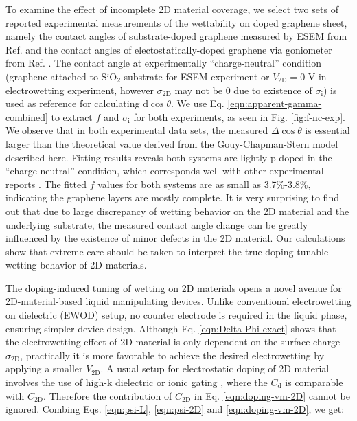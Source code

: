 \documentclass[aps,prl,reprint,groupedaddress,amsmath,amssymb, showpacs]{revtex4-1}
\begin{document}
To examine the effect of incomplete 2D material coverage, we select
two sets of reported experimental measurements of the wettability on
doped graphene sheet, namely the contact angles of substrate-doped
graphene measured by ESEM from Ref. \cite{ashraf_doping-induced_2016}
and the contact angles of electostatically-doped graphene via
goniometer from Ref. \cite{hong_mechanism_2016}. The contact angle at
experimentally ``charge-neutral'' condition (graphene attached to SiO\(_{\text{2}}\)
substrate for ESEM experiment or \(V_{\mathrm{2D}}=0\) V in
electrowetting experiment, however \(\sigma_{\mathrm{2D}}\) may not be 0
due to existence of \(\sigma_{\mathrm{i}}\)) is used as reference for
calculating \(\mathrm{d}\cos\theta\). We use
Eq. \ref{eqn:apparent-gamma-combined} to extract \(f\) and
\(\sigma_{\mathrm{i}}\) for both experiments, as seen in
Fig. \ref{fig:f-nc-exp}. We observe that in both experimental data sets,
the measured \(\Delta \cos \theta\) is essential larger than the
theoretical value derived from the Gouy-Chapman-Stern model described
here. Fitting results reveals both systems are lightly p-doped in the
``charge-neutral'' condition, which corresponds well with other
experimental reports
\cite{Shih2015PartiallyScreened,goniszewski_correlation_2016}.  The
fitted \(f\) values for both systems are as small as 3.7\%-3.8\%,
indicating the graphene layers are mostly complete. It is very
surprising to find out that due to large discrepancy of wetting
behavior on the 2D material and the underlying substrate, the measured
contact angle change can be greatly influenced by the existence of
minor defects in the 2D material. Our calculations show that extreme
care should be taken to interpret the true doping-tunable wetting
behavior of 2D materials.


The doping-induced tuning of wetting on 2D materials opens a novel
avenue for 2D-material-based liquid manipulating devices. Unlike
conventional electrowetting on dielectric (EWOD) setup, no counter
electrode is required in the liquid phase, ensuring simpler device
design. Although Eq. \ref{eqn:Delta-Phi-exact} shows that the
electrowetting effect of 2D material is only dependent on the surface
charge \(\sigma_{\mathrm{2D}}\), practically it is more favorable to
achieve the desired electrowetting by applying a smaller
\(V_{\mathrm{2D}}\). A usual setup for electrostatic doping of 2D
material involves the use of high-k dielectric or ionic gating
\cite{Das_2008,Radisavljevic_2011,Xu_2011,Newaz_2012}, where the
\(C_{\mathrm{d}}\) is comparable with \(C_{\mathrm{2D}}\). Therefore the
contribution of \(C_{\mathrm{2D}}\) in Eq. \ref{eqn:doping-vm-2D} cannot
be ignored. Combing Eqs. \ref{eqn:psi-L}, \ref{eqn:psi-2D} and
\ref{eqn:doping-vm-2D}, we get:
\end{document}
